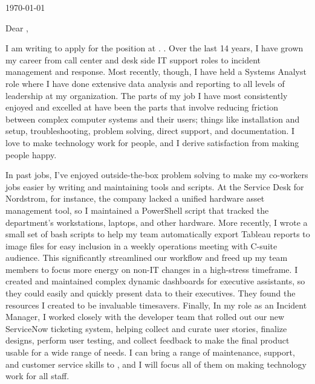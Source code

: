 \documentclass[10pt,oneside]{article}
\begin{document}
\hfill\dte\today
\heading
\vspace{\baselineskip}
\vspace{\baselineskip}

Dear ,

\vspace{\baselineskip}

I am writing to apply for the  position at . . Over the last 14 years, I have grown my career from call center and desk side IT support roles to incident management and response. Most recently, though, I have held a Systems Analyst role where I have done extensive data analysis and reporting to all levels of leadership at my organization. The parts of my job I have most consistently enjoyed and excelled at have been the parts that involve reducing friction between complex computer systems and their users; things like installation and setup, troubleshooting, problem solving, direct support, and documentation. I love to make technology work for people, and I derive satisfaction from making people happy.

\vspace{\baselineskip}

In past jobs, I’ve enjoyed outside-the-box problem solving to make my co-workers jobs easier by writing and maintaining tools and scripts. At the Service Desk for Nordstrom, for instance, the company lacked a unified hardware asset management tool, so I maintained a PowerShell script that tracked the department’s workstations, laptops, and other hardware. More recently, I wrote a small set of bash scripts to help my team automatically export Tableau reports to image files for easy inclusion in a weekly operations meeting with C-suite audience. This significantly streamlined our workflow and freed up my team members to focus more energy on non-IT changes in a high-stress timeframe. I created and maintained complex dynamic dashboards for executive assistants, so they could easily and quickly present data to their executives. They found the resources I created to be invaluable timesavers. Finally, In my role as an Incident Manager, I worked closely with the developer team that rolled out our new ServiceNow ticketing system, helping collect and curate user stories, finalize designs, perform user testing, and collect feedback to make the final product usable for a wide range of needs. I can bring a range of maintenance, support, and customer service skills to , and I will focus all of them on making technology work for all  staff.
\end{document}
